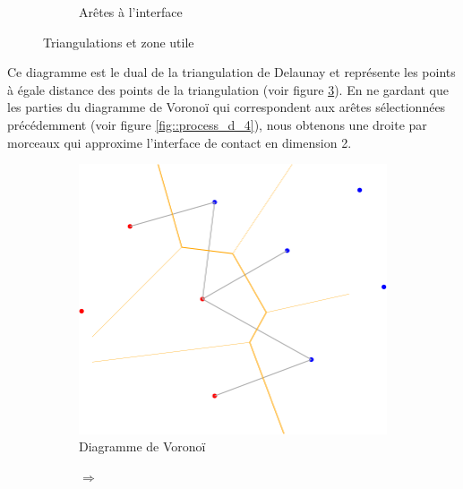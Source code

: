 \begin{figure}[ht]
\begin{subfigure}{0.45\textwidth}
  \caption{Arêtes à l'interface}
  \label{fig::process_d_2}
\end{subfigure}
\caption{Triangulations et zone utile}
\label{fig::delaunays_process_1}
\end{figure}


Ce diagramme est le dual de la triangulation de Delaunay et représente les points à
égale distance des points de la triangulation (voir figure \ref{fig::process_d_3}).
En ne gardant que les parties du diagramme de Voronoï qui correspondent aux arêtes sélectionnées
précédemment (voir figure \ref{fig::process_d_4}), nous obtenons une droite par morceaux
qui approxime l'interface de contact en dimension 2.

\begin{figure}[ht]
\centering
\begin{subfigure}{0.45\textwidth}
  \centering
  \includegraphics[width=\textwidth]{figures/process_d_3.png}
  \caption{Diagramme de Voronoï}
  \label{fig::process_d_3}
\end{subfigure}%
\begin{subfigure}{0.1\textwidth}
  \centering
  $\Longrightarrow$
\end{subfigure}%
\begin{subfigure}{0.45\textwidth}
  \centering

\end{subfigure}
\end{figure}
